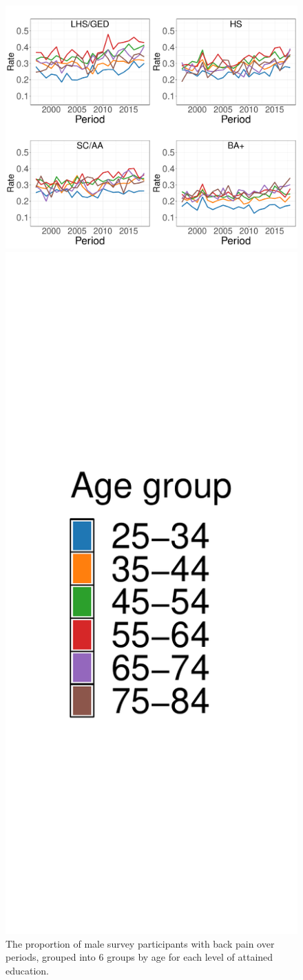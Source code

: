 \begin{figure}[!ht]
    \centering
    \begin{minipage}{.5\textwidth}
      \centering
      \includegraphics[width=1.6\linewidth]{Figures/rateplot_age_m.pdf}
    \end{minipage}%
    \begin{minipage}{.5\textwidth}
      \hfill
      \includegraphics[width=0.4\linewidth]{Figures/rateplot_age_legend_m.pdf}
    \end{minipage}
    \caption{The proportion of male survey participants with back pain over periods, grouped into $6$ groups by age for each level of attained education.}
    \label{figure:explorative:rateplot_age_m}
\end{figure}

